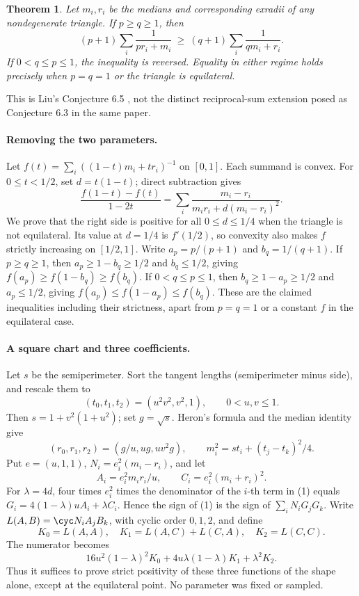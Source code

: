 \documentclass[11pt,a4paper]{article}
\numberwithin{equation}{section}
\newtheorem{theorem}{Theorem}[section]
\theoremstyle{definition}
\theoremstyle{remark}
\begin{document}
\begin{theorem}
Let $m_i,r_i$ be the medians and corresponding exradii of any nondegenerate triangle. If $p\ge q\ge1$, then
\[
 (p+1)\sum_i\frac1{p r_i+m_i}
 \ \ge\ (q+1)\sum_i\frac1{q m_i+r_i}.
\]
If $0<q\le p\le1$, the inequality is reversed. Equality in either regime holds precisely when $p=q=1$ or the triangle is equilateral.
\end{theorem}
This is Liu's Conjecture 6.5 \cite[p.~62, Eq.~(6.6)]{r36meiji:liu}, not the distinct reciprocal-sum extension posed as Conjecture 6.3 in the same paper.

\paragraph{Removing the two parameters.}
Let $f(t)=\sum_i((1-t)m_i+tr_i)^{-1}$ on $[0,1]$. Each summand is convex. For $0\le t<1/2$, set $d=t(1-t)$; direct subtraction gives
\[
 \frac{f(1-t)-f(t)}{1-2t}
   =\sum_i\frac{m_i-r_i}{m_ir_i+d(m_i-r_i)^2}.
 \tag{1}
\]
We prove that the right side is positive for all $0\le d\le1/4$ when the triangle is not equilateral. Its value at $d=1/4$ is $f'(1/2)$, so convexity also makes $f$ strictly increasing on $[1/2,1]$. Write $a_p=p/(p+1)$ and $b_q=1/(q+1)$. If $p\ge q\ge1$, then $a_p\ge1-b_q\ge1/2$ and $b_q\le1/2$, giving
$f(a_p)\ge f(1-b_q)\ge f(b_q)$. If $0<q\le p\le1$, then $b_q\ge1-a_p\ge1/2$ and $a_p\le1/2$, giving $f(a_p)\le f(1-a_p)\le f(b_q)$. These are the claimed inequalities including their strictness, apart from $p=q=1$ or a constant $f$ in the equilateral case.

\paragraph{A square chart and three coefficients.}
Let $s$ be the semiperimeter. Sort the tangent lengths (semiperimeter minus side), and rescale them to
\[
 (t_0,t_1,t_2)=(u^2v^2,v^2,1),\qquad 0<u,v\le1.
\]
Then $s=1+v^2(1+u^2)$; set $g=\sqrt{s}$. Heron's formula and the median identity give
\[
 (r_0,r_1,r_2)=(g/u,ug,uv^2g),\qquad
 m_i^2=st_i+(t_j-t_k)^2/4 .
\]
Put $e=(u,1,1)$, $N_i=e_i^2(m_i-r_i)$, and let
\[
 A_i=e_i^2 m_ir_i/u,\qquad C_i=e_i^2(m_i+r_i)^2 .
\]
For $\lambda=4d$, four times $e_i^2$ times the denominator of the $i$-th term in (1) equals $G_i=4(1-\lambda)u A_i+\lambda C_i$. Hence the sign of (1) is the sign of $\sum_i N_iG_jG_k$. Write $L(A,B)=\cyc N_i A_j B_k$, with cyclic order $0,1,2$, and define
\[
 K_0=L(A,A),\quad K_1=L(A,C)+L(C,A),\quad K_2=L(C,C).
\]
The numerator becomes
\[
 16u^2(1-\lambda)^2 K_0+
 4u\lambda(1-\lambda)K_1+\lambda^2K_2.
 \tag{2}
\]
Thus it suffices to prove strict positivity of these three functions of the shape alone, except at the equilateral point. No parameter was fixed or sampled.
\end{document}
